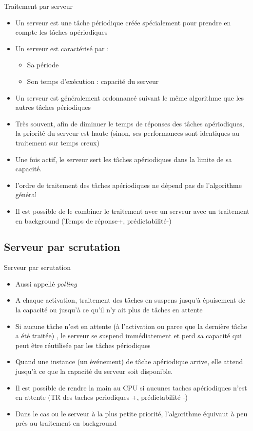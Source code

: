 \begin{frame}{Traitement par serveur} 
  \begin{itemize}
  \item Un  serveur est une  tâche périodique créée  spécialement pour
    prendre en compte les tâches apériodiques
  \item Un serveur est caractérisé par :
    \begin{itemize}
    \item Sa période 
    \item Son temps d'exécution : capacité du serveur  
    \end{itemize}
  \item Un serveur est généralement ordonnancé suivant  le même algorithme
    que les autres tâches périodiques
  \item Très  souvent, afin  de diminuer le  temps de  réponses des tâches
    apériodiques,  la  priorité  du   serveur  est  haute  (sinon,  ses
    performances sont identiques au traitement sur temps creux)
  \item Une fois actif, le serveur sert les tâches apériodiques dans
    la limite de sa capacité.
  \item l'ordre de traitement  des tâches apériodiques ne dépend pas
    de l'algorithme général
  \item Il est  possible de le combiner le  traitement avec un serveur
    avec   un   traitement   en   background   (Temps   de   réponse+,
    prédictabilité-)
  \end{itemize}
\end{frame}

\subsection{Serveur par scrutation}

\begin{frame}{Serveur par scrutation}
  \begin{itemize}
  \item Aussi appellé \emph{polling}
  \item A chaque activation,  traitement des tâches en suspens jusqu'à
    épuisement  de la capacité  ou jusqu'à  ce qu'il  n'y ait  plus de
    tâches en attente
  \item Si aucune tâche n'est  en attente (à l'activation ou parce que
    la  dernière  tâche  a  été  traitée)  ,  le  serveur  se  suspend
    immédiatement et perd sa capacité qui peut être réutilisée par les
    tâches périodiques
  \item Quand une instance (un événement) de tâche apériodique arrive,
    elle attend jusqu’à ce que la capacité du serveur soit disponible.
  \item  Il est  possible de  rendre la  main au  CPU si  aucunes taches
    apériodiques  n'est  en  attente  (TR  des  taches  periodiques  +,
    prédictabilité -)
  \item  Dans  le  cas  ou  le  serveur à  la  plus  petite  priorité,
    l'algorithme équivaut à peu près au traitement en background
  \end{itemize}
\end{frame} 

